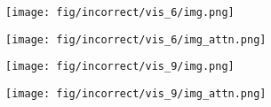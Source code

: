 \documentclass{article} \usepackage[dvipsnames,table]{xcolor}
\begin{document}
\begin{figure}[t]
    \centering
    \begin{minipage}[t]{0.47\linewidth}
        \centering
        
    \end{minipage}
    \begin{minipage}[t]{0.47\linewidth}
        \centering
        
    \end{minipage}
    
\centering
    \begin{minipage}[t]{0.47\linewidth}
        \begin{minipage}{0.47\linewidth}
            \centering
            \texttt{[image: fig/incorrect/vis\_6/img.png]}
        \end{minipage}
        \begin{minipage}{0.47\linewidth}
            \centering
            \texttt{[image: fig/incorrect/vis\_6/img\_attn.png]}
        \end{minipage}
    \end{minipage}
    \begin{minipage}[t]{0.47\linewidth}
        \begin{minipage}{0.47\linewidth}
            \centering
            \texttt{[image: fig/incorrect/vis\_9/img.png]}
        \end{minipage}
        \begin{minipage}{0.47\linewidth}
            \centering
            \texttt{[image: fig/incorrect/vis\_9/img\_attn.png]}
        \end{minipage}
    \end{minipage}
    
    \centering
    \begin{minipage}[t]{0.47\linewidth}
        \centering
        
    \end{minipage}
    \begin{minipage}[t]{0.47\linewidth}
        \centering
        
    \end{minipage}
    

\end{figure}
\end{document}
